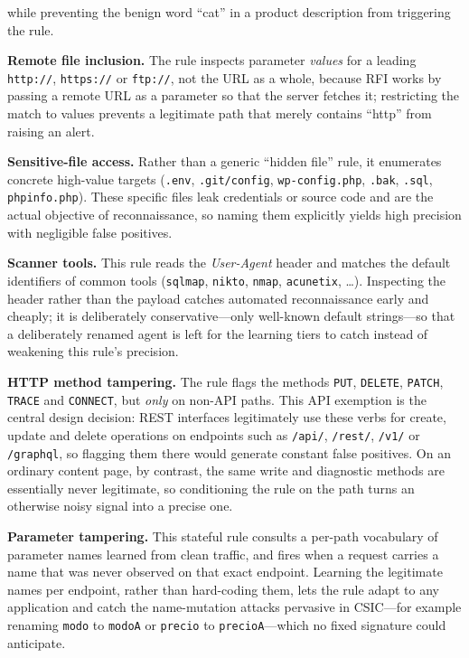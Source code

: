 \documentclass[../main.tex]{subfiles}
\begin{document}
\begin{romanlist}
        while preventing the benign word ``cat'' in a product description from
        triggering the rule.
  \item \textbf{Remote file inclusion.} The rule inspects parameter
        \emph{values} for a leading \texttt{http://}, \texttt{https://} or
        \texttt{ftp://}, not the URL as a whole, because RFI works by passing a
        remote URL as a parameter so that the server fetches it; restricting
        the match to values prevents a legitimate path that merely contains
        ``http'' from raising an alert.
  \item \textbf{Sensitive-file access.} Rather than a generic ``hidden file''
        rule, it enumerates concrete high-value targets (\texttt{.env},
        \texttt{.git/config}, \texttt{wp-config.php}, \texttt{.bak},
        \texttt{.sql}, \texttt{phpinfo.php}). These specific files leak
        credentials or source code and are the actual objective of
        reconnaissance, so naming them explicitly yields high precision with
        negligible false positives.
  \item \textbf{Scanner tools.} This rule reads the \emph{User-Agent} header
        and matches the default identifiers of common tools (\texttt{sqlmap},
        \texttt{nikto}, \texttt{nmap}, \texttt{acunetix}, \dots). Inspecting
        the header rather than the payload catches automated reconnaissance
        early and cheaply; it is deliberately conservative---only well-known
        default strings---so that a deliberately renamed agent is left for the
        learning tiers to catch instead of weakening this rule's precision.
  \item \textbf{HTTP method tampering.} The rule flags the methods
        \texttt{PUT}, \texttt{DELETE}, \texttt{PATCH}, \texttt{TRACE} and
        \texttt{CONNECT}, but \emph{only} on non-API paths. This API exemption
        is the central design decision: REST interfaces legitimately use these
        verbs for create, update and delete operations on endpoints such as
        \texttt{/api/}, \texttt{/rest/}, \texttt{/v1/} or \texttt{/graphql}, so
        flagging them there would generate constant false positives. On an
        ordinary content page, by contrast, the same write and diagnostic
        methods are essentially never legitimate, so conditioning the rule on
        the path turns an otherwise noisy signal into a precise one.
  \item \textbf{Parameter tampering.} This stateful rule consults a per-path
        vocabulary of parameter names learned from clean traffic, and fires
        when a request carries a name that was never observed on that exact
        endpoint. Learning the legitimate names per endpoint, rather than
        hard-coding them, lets the rule adapt to any application and catch the
        name-mutation attacks pervasive in CSIC---for example renaming
        \texttt{modo} to \texttt{modoA} or \texttt{precio} to
        \texttt{precioA}---which no fixed signature could anticipate.
\end{romanlist}
\end{document}
